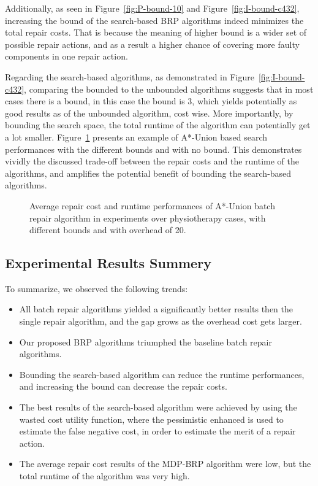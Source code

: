 \documentclass[a4paper,11pt]{report}
\newcommand\roni[1]{\textcolor{green}{roni: #1}}
\begin{document}
Additionally, as seen in Figure~\ref{fig:P-bound-10} and Figure~\ref{fig:I-bound-c432}, increasing the bound of the search-based BRP algorithms indeed minimizes the total repair costs. That is because the meaning of higher bound is a wider set of possible repair actions, and as a result a higher chance of covering more faulty components in one repair action.

Regarding the search-based algorithms, as demonstrated in Figure~\ref{fig:I-bound-c432}, comparing the bounded to the unbounded algorithms suggests that in most cases there is a bound, in this case the bound is 3, which yields potentially as good results as of the unbounded algorithm, cost wise. More importantly, by bounding the search space, the total runtime of the algorithm can potentially get a lot smaller. Figure~\ref{fig:P-AU-20} presents an example of A*-Union based search performances with the different bounds and with no bound. This demonstrates vividly the discussed trade-off between the repair costs and the runtime of the algorithms, and amplifies the potential benefit of bounding the search-based algorithms.

\begin{figure}{}
  \caption{Average repair cost and runtime performances of A*-Union batch repair algorithm in experiments over physiotherapy cases, with different bounds and with overhead of 20.}
  \label{fig:P-AU-20}
\end{figure}


\subsection{Experimental Results Summery}

To summarize, we observed the following trends:
\begin{itemize}
\item All batch repair algorithms yielded a significantly better results then the single repair algorithm, and the gap grows as the overhead cost gets larger. 
\item Our proposed BRP algorithms triumphed the baseline batch repair algorithms.
\item Bounding the search-based algorithm can reduce the runtime performances, and increasing the bound can decrease the repair costs. 
\item The best results of the search-based algorithm were achieved by using the wasted cost utility function, where the pessimistic enhanced is used to estimate the false negative cost, in order to estimate the merit of a repair action.
\item The average repair cost results of the MDP-BRP algorithm were low, but the total runtime of the algorithm was very high.
\end{itemize}
\end{document}
